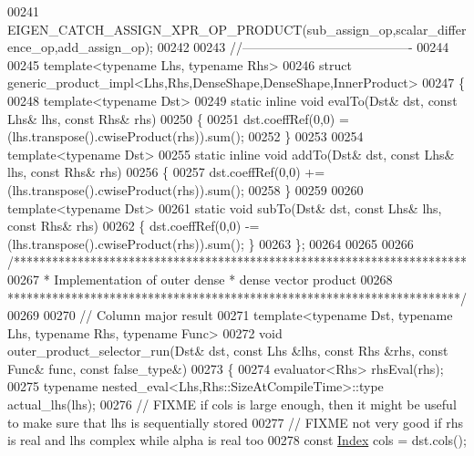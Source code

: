 \begin{DoxyCode}
00241 EIGEN\_CATCH\_ASSIGN\_XPR\_OP\_PRODUCT(sub\_assign\_op,scalar\_difference\_op,add\_assign\_op);
00242 
00243 \textcolor{comment}{//----------------------------------------}
00244 
00245 \textcolor{keyword}{template}<\textcolor{keyword}{typename} Lhs, \textcolor{keyword}{typename} Rhs>
00246 \textcolor{keyword}{struct }generic\_product\_impl<Lhs,Rhs,DenseShape,DenseShape,InnerProduct>
00247 \{
00248   \textcolor{keyword}{template}<\textcolor{keyword}{typename} Dst>
00249   \textcolor{keyword}{static} \textcolor{keyword}{inline} \textcolor{keywordtype}{void} evalTo(Dst& dst, \textcolor{keyword}{const} Lhs& lhs, \textcolor{keyword}{const} Rhs& rhs)
00250   \{
00251     dst.coeffRef(0,0) = (lhs.transpose().cwiseProduct(rhs)).sum();
00252   \}
00253   
00254   \textcolor{keyword}{template}<\textcolor{keyword}{typename} Dst>
00255   \textcolor{keyword}{static} \textcolor{keyword}{inline} \textcolor{keywordtype}{void} addTo(Dst& dst, \textcolor{keyword}{const} Lhs& lhs, \textcolor{keyword}{const} Rhs& rhs)
00256   \{
00257     dst.coeffRef(0,0) += (lhs.transpose().cwiseProduct(rhs)).sum();
00258   \}
00259   
00260   \textcolor{keyword}{template}<\textcolor{keyword}{typename} Dst>
00261   \textcolor{keyword}{static} \textcolor{keywordtype}{void} subTo(Dst& dst, \textcolor{keyword}{const} Lhs& lhs, \textcolor{keyword}{const} Rhs& rhs)
00262   \{ dst.coeffRef(0,0) -= (lhs.transpose().cwiseProduct(rhs)).sum(); \}
00263 \};
00264 
00265 
00266 \textcolor{comment}{/***********************************************************************}
00267 \textcolor{comment}{*  Implementation of outer dense * dense vector product}
00268 \textcolor{comment}{***********************************************************************/}
00269 
00270 \textcolor{comment}{// Column major result}
00271 \textcolor{keyword}{template}<\textcolor{keyword}{typename} Dst, \textcolor{keyword}{typename} Lhs, \textcolor{keyword}{typename} Rhs, \textcolor{keyword}{typename} Func>
00272 \textcolor{keywordtype}{void} outer\_product\_selector\_run(Dst& dst, \textcolor{keyword}{const} Lhs &lhs, \textcolor{keyword}{const} Rhs &rhs, \textcolor{keyword}{const} Func& func, \textcolor{keyword}{const} 
      false\_type&)
00273 \{
00274   evaluator<Rhs> rhsEval(rhs);
00275   \textcolor{keyword}{typename} nested\_eval<Lhs,Rhs::SizeAtCompileTime>::type actual\_lhs(lhs);
00276   \textcolor{comment}{// FIXME if cols is large enough, then it might be useful to make sure that lhs is sequentially stored}
00277   \textcolor{comment}{// FIXME not very good if rhs is real and lhs complex while alpha is real too}
00278   \textcolor{keyword}{const} \hyperlink{namespace_eigen_a62e77e0933482dafde8fe197d9a2cfde}{Index} cols = dst.cols();

\end{DoxyCode}
